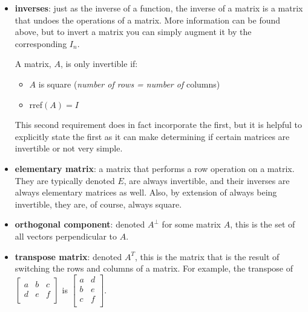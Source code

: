 \documentclass[12pt]{article}
\begin{document}
{\begin{itemize}
        Note that "$\circ$" is read as "$T$ composed with $S$".

        Its important to note that it is \textit{not necessarily true} that $S \circ T = T \circ S$.

        \item \textbf{inverses}: just as the inverse of a function, the inverse of a matrix is a matrix that undoes the operations of a matrix. More information can be found above, but to invert a matrix you can simply augment it by the corresponding $I_n$.
        
        A matrix, $A$, is only invertible if:

        \begin{itemize}
            \item $A$ is square (\textit{number of rows = number of} columns)
            \item rref$(A) = I$
        \end{itemize}

        This second requirement does in fact incorporate the first, but it is helpful to explicitly state the first as it can make determining if certain matrices are invertible or not very simple.

        \item \textbf{elementary matrix}: a matrix that performs a row operation on a matrix. They are typically denoted $E$, are always invertible, and their inverses are always elementary matrices as well. Also, by extension of always being invertible, they are, of course, always square.
        
        \item \textbf{orthogonal component}: denoted $A^\bot$ for some matrix $A$, this is the set of all vectors perpendicular to $A$.
        
        \item \textbf{transpose matrix}: denoted $A^T$, this is the matrix that is the result of switching the rows and columns of a matrix. For example, the transpose of $\begin{bmatrix}
            a & b & c\\
            d & e & f\\
        \end{bmatrix}$ is $\begin{bmatrix}
            a & d\\
            b & e\\
            c & f\\
        \end{bmatrix}$.


\end{itemize}}
\end{document}
